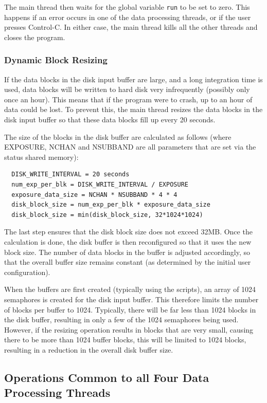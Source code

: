 \documentclass[11pt]{article} %
\begin{document}
The main thread then waits for the global variable \texttt{run} to be set to zero. This happens if an error occurs in one of the data processing threads, or if the user presses Control-C. In either case, the main thread kills all the other threads and closes the program.

\subsubsection{Dynamic Block Resizing}
If the data blocks in the disk input buffer are large, and a long integration time is used, data blocks will be written to hard disk very infrequently (possibly only once an hour). This means that if the program were to crash, up to an hour of data could be lost. To prevent this, the main thread resizes the data blocks in the disk input buffer so that these data blocks fill up every 20 seconds.

The size of the blocks in the disk buffer are calculated as follows (where EXPOSURE, NCHAN and NSUBBAND are all parameters that are set via the status shared memory):

\begin{verbatim}
  DISK_WRITE_INTERVAL = 20 seconds
  num_exp_per_blk = DISK_WRITE_INTERVAL / EXPOSURE
  exposure_data_size = NCHAN * NSUBBAND * 4 * 4
  disk_block_size = num_exp_per_blk * exposure_data_size
  disk_block_size = min(disk_block_size, 32*1024*1024)
\end{verbatim}

The last step ensures that the disk block size does not exceed 32MB. Once the calculation is done, the disk buffer is then reconfigured so that it uses the new block size. The number of data blocks in the buffer is adjusted accordingly, so that the overall buffer size remains constant (as determined by the initial user configuration).

When the buffers are first created (typically using the scripts), an array of 1024 semaphores is created for the disk input buffer. This therefore limits the number of blocks per buffer to 1024. Typically, there will be far less than 1024 blocks in the disk buffer, resulting in only a few of the 1024 semaphores being used. However, if the resizing operation results in blocks that are very small, causing there to be more than 1024 buffer blocks, this will be limited to 1024 blocks, resulting in a reduction in the overall disk buffer size.

\subsection{Operations Common to all Four Data Processing Threads}
\end{document}

